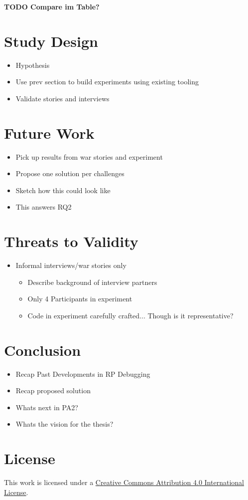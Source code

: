 \documentclass[12pt,a4paper]{article}
\begin{document}
\textbf{TODO Compare im Table?}


\section{Study Design}
\label{sec:study}

\begin{itemize}
	\item Hypothesis
	\item Use prev section to build experiments using existing tooling
	\item Validate stories and interviews
\end{itemize}

\section{Future Work}
\label{sec:future}

\begin{itemize}
	\item Pick up results from war stories and experiment
	\item Propose one solution per challenges
	\item Sketch how this could look like
	\item This answers RQ2
\end{itemize}

\section{Threats to Validity}
\label{sec:threats}

\begin{itemize}
	\item Informal interviews/war stories only
	\begin{itemize}
		\item Describe background of interview partners
		\item Only 4 Participants in experiment
		\item Code in experiment carefully crafted... Though is it representative?
		\
	\end{itemize}
\end{itemize}

\section{Conclusion}
\label{sec:conclusion}

\begin{itemize}
	\item Recap Past Developments in RP Debugging
	\item Recap proposed solution
	\item Whats next in PA2?
	\item Whats the vision for the thesis?
\end{itemize}





\section*{License}
\ccby\thinspace\thinspace This work is licensed under a \href{https://creativecommons.org/licenses/by/4.0/}{Creative Commons Attribution 4.0 International License}.
\end{document}
